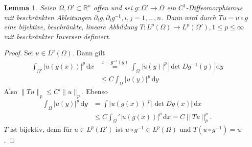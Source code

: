 \documentclass[
paper=a4,
bibtotocnumbered,
liststotocnumbered,
tablecaptionabove,
pointlessnumbers,
twoside,
openright,
10pt
]
{report}
\newtheorem{lem}[thm]{Lemma}
\theoremstyle{definition}
\numberwithin{equation}{chapter}
\begin{document}
\begin{lem}\label{4.2}
 Seien $\Omega, \Omega'\subset \mathbb R^n$ offen und sei $g: \Omega' \to \Omega$ ein $C^1$-Diffeomorphismus
 mit beschränkten Ableitungen $\partial_i g, \partial_i g^{-1}, i,j=1,\ldots, n$. Dann wird durch $Tu=u\circ g$
 eine bijektive, beschränkte, lineare Abbildung $T: L^p(\Omega) \to L^p(\Omega'), 1 \le p \le \infty$ mit beschränkter Inversen definiert.
\end{lem}
\begin{proof}
 Sei $u\in L^p(\Omega)$. Dann gilt 
 \begin{align*}
  \int_{\Omega'} |u(g(x))|^p\, \mathrm dx &\stackrel{x=g^{-1}(y)}{=} \int_\Omega |u(y)|^p | \det Dg^{-1}(y)|\,\mathrm dy\\
  &\le C\int_\Omega |u(y)|^p\, \mathrm dy
 \end{align*}
Also $\|Tu\|_p \le C' \|u\|_p$.  Ebenso
\begin{align*}
 \int_\Omega |u(y)|^p\, \mathrm dy &= \int |u(g(x))|^p |\det Dg(x)|\,\mathrm dx \\
 &\le C\int_\Omega' |u(g(x))|^p\, \mathrm dx = C\|Tu\|_p^p.
\end{align*}
$T$ ist bijektiv, denn für $u\in L^p(\Omega')$ ist $u\circ g^{-1} \in L^p(\Omega)$ und  $T(u\circ g^{-1})=u$.
\end{proof}
\end{document}
